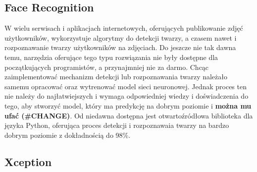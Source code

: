 \subsection{Face Recognition}
W wielu serwisach i aplikacjach internetowych, oferujących publikowanie zdjęć użytkowników, wykorzystuje algorytmy do detekcji twarzy, a czasem nawet i rozpoznawanie twarzy użytkowników na zdjęciach. Do jeszcze nie tak dawna temu, narzędzia oferujące tego typu rozwiązania nie były dostępne dla początkujących programistów, a przynajmniej nie za darmo. Chcąc zaimplementować mechanizm detekcji lub rozpoznawania twarzy należało samemu opracować oraz wytrenować model sieci neuronowej. Jednak proces ten nie należy do najłatwiejszych i wymaga odpowiedniej wiedzy i doświadczenia do tego, aby stworzyć model, który ma predykcję na dobrym poziomie i \textbf{można mu ufać (#CHANGE)}.
Od niedawna dostępna jest otwartoźródłowa biblioteka dla języka Python, oferująca proces detekcji i rozpoznawaia twarzy na bardzo dobrym poziomie z dokładnością do 98\%.\\

\subsection{Xception}

